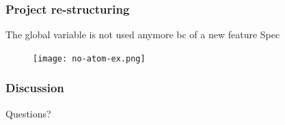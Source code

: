 \documentclass{beamer}
\begin{document}
\begin{frame}
  \frametitle{Project re-structuring}
The global variable is not used anymore bc of a new feature Spec
\begin{figure}
\texttt{[image: no-atom-ex.png]}
\end{figure}
\end{frame}

\begin{frame}
  \frametitle{Discussion}
Questions?
\end{frame}
\end{document}
